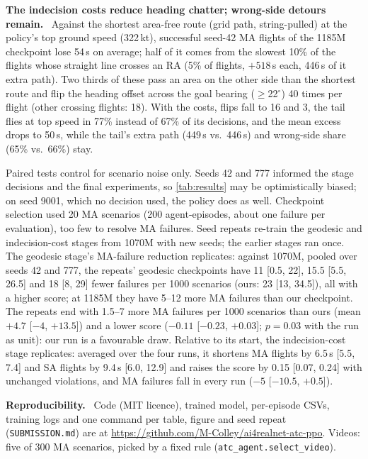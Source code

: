 \documentclass[10pt,twocolumn]{article}
\makeatletter
\renewcommand\section{\@startsection{section}{1}{\z@}{-2ex plus -.5ex minus -.2ex}{1ex plus .2ex}{\normalfont\large\bfseries}}
\renewcommand{\paragraph}[1]{\par\smallskip\noindent\textbf{#1}\ }
\makeatother
\begin{document}
\paragraph{The indecision costs reduce heading chatter; wrong-side detours remain.}
Against the shortest area-free route (grid path, string-pulled) at the
policy's top ground speed (322\,kt), successful seed-42 MA flights of the 1185M
checkpoint lose 54\,s on average; half of it comes from the slowest 10\% of
the flights whose straight line crosses an RA (5\% of flights, $+518$\,s each,
446\,s of it extra path). Two thirds of these pass an area on the other side than the
shortest route and flip the heading offset across the goal bearing
($\geq$22$^\circ$) 40 times per flight (other crossing flights: 18). With the
costs, flips fall to 16 and 3, the tail flies at top speed
in 77\% instead of 67\% of its decisions, and the mean excess drops to 50\,s,
while the tail's extra path (449\,s vs.\ 446\,s) and wrong-side share (65\%
vs.\ 66\%) stay.

\section{Limitations}\label{sec:limits}
Paired tests control for scenario noise only. Seeds 42 and 777 informed the
stage decisions and the final experiments, so \autoref{tab:results} may be
optimistically biased; on seed 9001, which no decision used, the policy does as
well. Checkpoint selection used 20 MA scenarios (200 agent-episodes, about one
failure per evaluation), too few to resolve MA failures. Seed repeats re-train
the geodesic and indecision-cost stages from 1070M with new seeds; the earlier
stages ran once. The geodesic stage's MA-failure
reduction replicates: against 1070M, pooled over seeds 42 and 777, the
repeats' geodesic checkpoints have 11 [0.5, 22], 15.5 [5.5, 26.5] and 18 [8,
29] fewer failures per 1000 scenarios (ours: 23 [13, 34.5]), all with a higher
score; at 1185M they have 5--12 more MA failures than our checkpoint. The
repeats end with 1.5--7 more MA failures per 1000 scenarios than ours (mean
$+4.7$ [$-4$, $+13.5$]) and a lower score ($-0.11$ [$-0.23$, $+0.03$];
$p=0.03$ with the run as unit): our run is a favourable draw. Relative
to its start, the indecision-cost stage replicates: averaged over the four runs, it shortens MA
flights by 6.5\,s [5.5, 7.4] and SA flights by 9.4\,s [6.0, 12.9] and raises
the score by 0.15 [0.07, 0.24] with unchanged violations, and MA failures fall
in every run ($-5$ [$-10.5$, $+0.5$]).

\paragraph{Reproducibility.} Code (MIT licence), trained model, per-episode CSVs, training logs and one
command per table, figure and seed repeat (\texttt{SUBMISSION.md}) are at
\url{https://github.com/M-Colley/ai4realnet-atc-ppo}. Videos: five of 300 MA
scenarios, picked by a fixed rule (\texttt{atc\_agent.select\_video}).

{\footnotesize\raggedright\setlength{\bibsep}{0pt plus 0.5pt}

}
\end{document}
